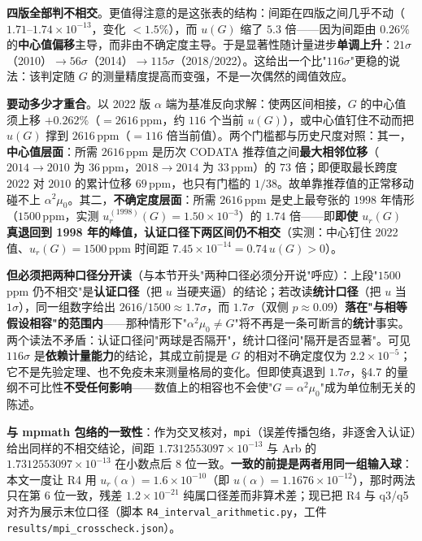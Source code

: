 \documentclass[12pt,a4paper]{article}
\begin{document}
\noindent\textbf{四版全部判不相交}。更值得注意的是这张表的结构：间距在四版之间几乎不动（$1.71$--$1.74\times10^{-13}$，变化 $<1.5\%$），而 $u(G)$ 缩了 $5.3$ 倍——因为间距由 $0.26\%$ 的\textbf{中心值偏移}主导，而非由不确定度主导。于是显著性随计量进步\textbf{单调上升}：$21\sigma$（2010）$\to 56\sigma$（2014）$\to 115\sigma$（2018/2022）。这给出一个比"$116\sigma$"更稳的说法：该判定随 $G$ 的测量精度提高而变强，不是一次偶然的阈值效应。

\noindent\textbf{要动多少才重合}。以 2022 版 $\alpha$ 端为基准反向求解：使两区间相接，$G$ 的中心值须上移 $+0.262\%$（$=2616\,\mathrm{ppm}$，约 $116$ 个当前 $u(G)$），或中心值钉住不动而把 $u(G)$ 撑到 $2616\,\mathrm{ppm}$（$=116$ 倍当前值）。两个门槛都与历史尺度对照：其一，\textbf{中心值层面}：所需 $2616\,\mathrm{ppm}$ 是历次 CODATA 推荐值之间\textbf{最大相邻位移}（$2014 \to 2010$ 为 $36\,\mathrm{ppm}$，$2018 \to 2014$ 为 $33\,\mathrm{ppm}$）的 $73$ 倍；即便取最长跨度 $2022$ 对 $2010$ 的累计位移 $69\,\mathrm{ppm}$，也只有门槛的 $1/38$。故单靠推荐值的正常移动碰不上 $\alpha^2\mu_0$。其二，\textbf{不确定度层面}：所需 $2616\,\mathrm{ppm}$ 是史上最夸张的 $1998$ 年情形（$1500\,\mathrm{ppm}$，实测 $u_r^{(1998)}(G)=1.50\times10^{-3}$）的 $1.74$ 倍——即\textbf{即使 $u_r(G)$ 真退回到 1998 年的峰值，认证口径下两区间仍不相交}（实测：中心钉住 2022 值、$u_r(G)=1500\,\mathrm{ppm}$ 时间距 $7.45\times10^{-14}=0.74\,u(G)>0$）。

\noindent\textbf{但必须把两种口径分开读}（与本节开头"两种口径必须分开说"呼应）：上段"$1500$ ppm 仍不相交"是\textbf{认证口径}（把 $u$ 当硬夹逼）的结论；若改读\textbf{统计口径}（把 $u$ 当 $1\sigma$），同一组数字给出 $2616/1500 \approx 1.7\sigma$，而 $1.7\sigma$（双侧 $p \approx 0.09$）\textbf{落在"与相等假设相容"的范围内}——那种情形下"$\alpha^2\mu_0 \neq G$"将不再是一条可断言的\textbf{统计}事实。两个读法不矛盾：认证口径问"两球是否隔开"，统计口径问"隔开是否显著"。可见 $116\sigma$ 是\textbf{依赖计量能力}的结论，其成立前提是 $G$ 的相对不确定度仅为 $2.2\times10^{-5}$；它不是先验定理、也不免疫未来测量格局的变化。但即使真退到 $1.7\sigma$，§4.7 的量纲不可比性\textbf{不受任何影响}——数值上的相容也不会使"$G = \alpha^2\mu_0$"成为单位制无关的陈述。

\textbf{与 mpmath 包络的一致性}：作为交叉核对，\texttt{mpi}（误差传播包络，非逐舍入认证）给出同样的不相交结论，间距 $1.7312553097\times10^{-13}$ 与 Arb 的 $1.7312553097\times10^{-13}$ 在小数点后 8 位一致。\textbf{一致的前提是两者用同一组输入球}：本文一度让 R4 用 $u_r(\alpha)=1.6\times10^{-10}$（即 $u(\alpha)=1.1676\times10^{-12}$），那时两法只在第 6 位一致，残差 $1.2\times10^{-21}$ 纯属口径差而非算术差；现已把 R4 与 q3/q5 对齐为展示末位口径（脚本 \texttt{R4\_\allowbreak{}interval\_\allowbreak{}arithmetic.py}，工件 \texttt{results/mpi\_\allowbreak{}crosscheck.json}）。
\end{document}

